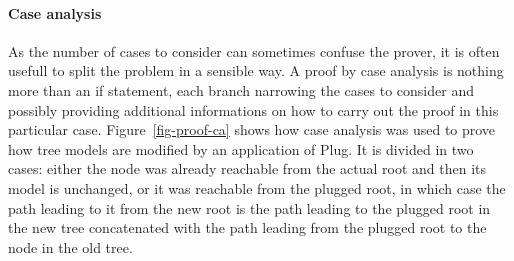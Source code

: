 \documentclass[11pt,a4paper]{article}
\begin{document}
\paragraph{Case analysis}
As the number of cases to consider can sometimes confuse the prover, it is often usefull to split the
problem in a sensible way. A proof by case analysis is nothing more than an if statement, each branch
narrowing the cases to consider and possibly providing additional informations on how to carry out
the proof in this particular case. Figure~\ref{fig-proof-ca} shows how case analysis was used to
prove how tree models are modified by an application of Plug. It is divided in two cases: either
the node was already reachable from the actual root and then its model is unchanged, or it was reachable
from the plugged root, in which case the path leading to it from the new root is the path leading to
the plugged root in the new tree concatenated with the path leading from the plugged root to the node
in the old tree. 
\end{document}
